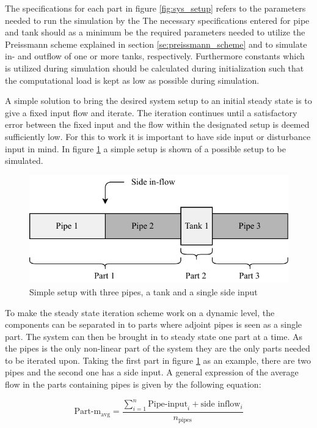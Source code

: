 The specifications for each part in figure \ref{fig:sys_setup} refers to the parameters needed to run the simulation by the 
The necessary specifications entered for pipe and tank should as a minimum be the required parameters needed to utilize the Preissmann scheme explained in section \ref{se:preissmann_scheme} and to simulate in- and outflow of one or more tanks, respectively. Furthermore constants which is utilized during simulation should be calculated during initialization such that the computational load is kept as low as possible during simulation. 

A simple solution to bring the desired system setup to an initial steady state is to give a fixed input flow and iterate. 
The iteration continues until a satisfactory error between the fixed input and the flow within the designated setup is deemed sufficiently low. For this to work it is important to have side input or disturbance input in mind. In figure \ref{fig:simple_sewer} a simple setup is shown of a possible setup to be simulated. 

\begin{figure}[H]
\centering
\includegraphics[width=0.55 \textwidth]{report/simulation/pictures/simple_sewer.pdf}
\caption{Simple setup with three pipes, a tank and a single side input}
\label{fig:simple_sewer}
\end{figure}

To make the steady state iteration scheme work on a dynamic level, the components can be separated in to parts where adjoint pipes is seen as a single part. The system can then be brought in to steady state one part at a time. As the pipes is the only non-linear part of the system they are the only parts needed to be iterated upon. Taking the first part in figure \ref{fig:simple_sewer} as an example, there are two pipes and the second one has a side input.
A general expression of the average flow in the parts containing pipes is given by the following equation:

\begin{equation}
 \text{Part-m}_{\text{avg}}	=  \frac{ \sum\limits_{i=1}^n \text{Pipe-input}_i + \text{side inflow}_i }{ n_{\text{pipes}} } 
 \end{equation} \label{avg_init_flow}

